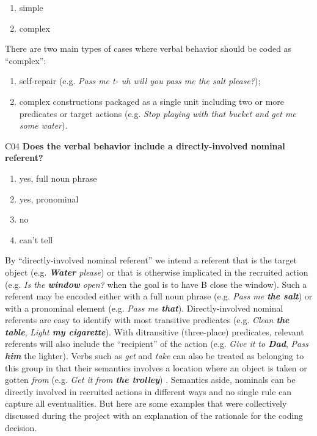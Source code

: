 \documentclass[output=paper]{langsci/langscibook}
\begin{document}
\begin{description}
\begin{enumerate}
\item simple
\item complex
\end{enumerate}

There are two main types of cases where verbal behavior should be coded as “complex”:

\begin{enumerate}
\item self-repair (e.g. \textit{Pass me t- uh will you pass me the salt please?});
\item complex constructions packaged as a single unit including two or more predicates or target actions (e.g. \textit{Stop playing with that bucket and get me some water}).
\end{enumerate}

\item
C04  \textbf{Does the verbal behavior include a directly-involved nominal referent?}

\begin{enumerate}
\item yes, full noun phrase
\item yes, pronominal
\item no
\item can’t tell
\end{enumerate}

By “directly-involved nominal referent” we intend a referent that is the target object (e.g. \textit{\textbf{Water} please}) or that is otherwise implicated in the recruited action (e.g. \textit{Is the \textbf{window} open?} when the goal is to have B close the window). Such a referent may be encoded either with a full noun phrase (e.g. \textit{Pass me \textbf{the salt}}) or with a pronominal element (e.g. \textit{Pass me \textbf{that}}). Directly-involved nominal referents are easy to identify with most transitive predicates (e.g. \textit{Clean \textbf{the table}}, \textit{Light \textbf{my cigarette}}). With ditransitive (three-place) predicates, relevant referents will also include the “recipient” of the action (e.g. \textit{Give it to \textbf{Dad}}, \textit{Pass \textbf{him}} the lighter). Verbs such as \textit{get} and \textit{take} can also be treated as belonging to this group in that their semantics involves a location where an object is taken or gotten \textit{from} (e.g. \textit{Get it from \textbf{the trolley}}) \citep{Fillmore1977}. Semantics aside, nominals can be directly involved in recruited actions in different ways and no single rule can capture all eventualities. But here are some examples that were collectively discussed during the project with an explanation of the rationale for the coding decision.


\end{description}
\end{document}
